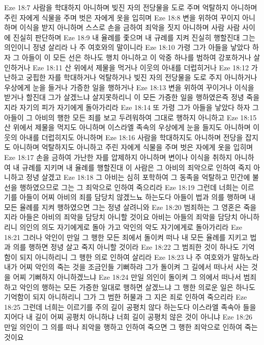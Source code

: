 Eze 18:7  사람을 학대하지 아니하며 빚진 자의 전당물을 도로 주며 억탈하지 아니하며 주린 자에게 식물을 주며 벗은 자에게 옷을 입히며
Eze 18:8  변을 위하여 꾸이지 아니하며 이식을 받지 아니하며 스스로 손을 금하여 죄악을 짓지 아니하며 사람 사람 사이에 진실히 판단하며
Eze 18:9  내 율례를 좇으며 내 규례를 지켜 진실히 행할진대 그는 의인이니 정녕 살리라 나 주 여호와의 말이니라
Eze 18:10  가령 그가 아들을 낳았다 하자 그 아들이 이 모든 선은 하나도 행치 아니하고 이 악중 하나를 범하여 강포하거나 살인하거나
Eze 18:11  산 위에서 제물을 먹거나 이웃의 아내를 더럽히거나
Eze 18:12  가난하고 궁핍한 자를 학대하거나 억탈하거나 빚진 자의 전당물을 도로 주지 아니하거나 우상에게 눈을 들거나 가증한 일을 행하거나
Eze 18:13  변을 위하여 꾸이거나 이식을 받거나 할진대 그가 살겠느냐 살지못하리니 이 모든 가증한 일을 행하였은즉 정녕 죽을지라 자기의 피가 자기에게 돌아가리라
Eze 18:14  또 가령 그가 아들을 낳았다 하자 그 아들이 그 아비의 행한 모든 죄를 보고 두려워하여 그대로 행하지 아니하고
Eze 18:15  산 위에서 제물을 먹지도 아니하며 이스라엘 족속의 우상에게 눈을 들지도 아니하며 이웃의 아내를 더럽히지도 아니하며
Eze 18:16  사람을 학대하지도 아니하며 전당을 잡지도 아니하며 억탈하지도 아니하고 주린 자에게 식물을 주며 벗은 자에게 옷을 입히며
Eze 18:17  손을 금하여 가난한 자를 압제하지 아니하며 변이나 이식을 취하지 아니하여 내 규례를 지키며 내 율례를 행할진대 이 사람은 그 아비의 죄악으로 인하여 죽지 아니하고 정녕 살겠고
Eze 18:18  그 아비는 심히 포학하여 그 동족을 억탈하고 민간에 불선을 행하였으므로 그는 그 죄악으로 인하여 죽으리라
Eze 18:19  그런데 너희는 이르기를 아들이 어찌 아비의 죄를 담당치 않겠느뇨 하는도다 아들이 법과 의를 행하며 내 모든 율례를 지켜 행하였으면 그는 정녕 살려니와
Eze 18:20  범죄하는 그 영혼은 죽을지라 아들은 아비의 죄악을 담당치 아니할 것이요 아비는 아들의 죄악을 담당치 아니하리니 의인의 의도 자기에게로 돌아 가고 악인의 악도 자기에게로 돌아가리라
Eze 18:21  그러나 악인이 만일 그 행한 모든 죄에서 돌이켜 떠나 내 모든 율례를 지키고 법과 의를 행하면 정녕 살고 죽지 아니할 것이라
Eze 18:22  그 범죄한 것이 하나도 기억함이 되지 아니하리니 그 행한 의로 인하여 살리라
Eze 18:23  나 주 여호와가 말하노라 내가 어찌 악인의 죽는 것을 조금인들 기뻐하랴 그가 돌이켜 그 길에서 떠나서 사는 것을 어찌 기뻐하지 아니하겠느냐
Eze 18:24  만일 의인이 돌이켜 그 의에서 떠나서 범죄하고 악인의 행하는 모든 가증한 일대로 행하면 살겠느냐 그 행한 의로운 일은 하나도 기억함이 되지 아니하리니 그가 그 범한 허물과 그 지은 죄로 인하여 죽으리라
Eze 18:25  그런데 너희는 이르기를 주의 길이 공평치 않다 하는도다 이스라엘 족속아 들을지어다 내 길이 어찌 공평치 아니하냐 너희 길이 공평치 않은 것이 아니냐
Eze 18:26  만일 의인이 그 의를 떠나 죄악을 행하고 인하여 죽으면 그 행한 죄악으로 인하여 죽는 것이요
